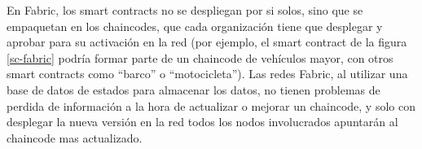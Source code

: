 En Fabric, los smart contracts no se despliegan por si solos, sino que se empaquetan en los chaincodes, que cada organización tiene que desplegar y aprobar para su activación en la red (por ejemplo, el smart contract de la figura \ref{sc-fabric} podría formar parte de un chaincode de vehículos mayor, con otros smart contracts como ``barco'' o ``motocicleta''). Las redes Fabric, al utilizar una base de datos de estados para almacenar los datos, no tienen problemas de perdida de información a la hora de actualizar o mejorar un chaincode, y solo con desplegar la nueva versión en la red todos los nodos involucrados apuntarán al chaincode mas actualizado.
 
